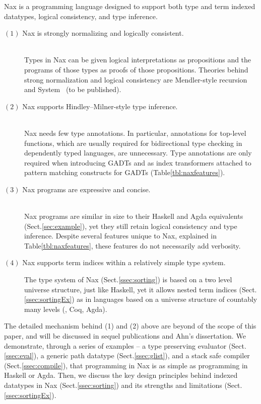 Nax is a programming language designed to support both type and
term indexed datatypes,
logical consistency, and type inference.
\begin{description}
\item[$(1)$ Nax is strongly normalizing and logically consistent.]~\\
Types in Nax can be given logical interpretations as propositions
and the programs of those types as proofs of those propositions.
Theories behind strong normalization and logical consistency are
Mendler-style recursion \cite{AhnShe11} and System \Fi\ (to be published).

\item[$(2)$ Nax supports Hindley--Milner-style type inference.]~\\
Nax needs few type annotations. In particular,
annotations for top-level functions, which are usually
required for bidirectional type checking in dependently typed languages,
are unnecessary.
Type annotations are only required when introducing GADTs and as
index transformers attached to pattern matching constructs for GADTs
(Table\;\ref{tbl:naxfeatures}).

\item[$(3)$ Nax programs are expressive and concise.]~\\
Nax programs are similar in size to their Haskell and Agda equivalents
(Sect.\;\ref{sec:example}), yet they still retain logical consistency
and type inference. Despite several features unique to Nax,
explained in Table\;\ref{tbl:naxfeatures}, these features
do not necessarily add verbosity.

\item[$(4)$ Nax supports term indices within a relatively simple type system.]
The type system of Nax (Sect.\;\ref{ssec:sorting}) is based on a
two level universe structure, just like Haskell, yet it allows nested term indices
(Sect.\;\ref{ssec:sortingEx}) as in languages
based on a universe structure of countably many levels (\eg, Coq, Agda).
\end{description}

The detailed mechanism behind (1) and (2) above are beyond of the scope of
this paper, and will be discussed in sequel publications and Ahn's dissertation.
We demonstrate, through a series of examples -- a type preserving evaluator (Sect.\;\ref{ssec:eval}),
a generic path datatype (Sect.\;\ref{ssec:glist}), and
a stack safe compiler (Sect.\;\ref{ssec:compile}), that programming in Nax 
is as simple as programming in Haskell or Agda.
Then, we discuss the key design principles behind indexed datatypes in Nax
(Sect.\;\ref{ssec:sorting}) and its strengths and limitations
(Sect.\;\ref{ssec:sortingEx}).

